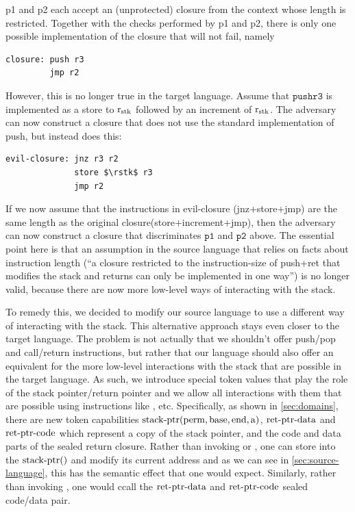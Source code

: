 \documentclass[a4paper]{article}
\begin{document}
p1 and p2 each accept an (unprotected) closure from the context whose length is restricted.
Together with the checks performed by p1 and p2, there is only one possible implementation of the closure that will not fail, namely
\begin{lstlisting}[basicstyle=\sourcecolor{}\ttfamily] 
closure: push r3
         jmp r2
\end{lstlisting}

However, this is no longer true in the target language.
Assume that $\mathtt{push r3}$ is implemented as a store to $\mathrm{r}_\mathrm{stk}$ followed by an increment of $\mathrm{r}_\mathrm{stk}$.
The adversary can now construct a closure that does not use the standard implementation of push, but instead does this:
\begin{lstlisting}[basicstyle=\targetcolor{}\ttfamily] 
evil-closure: jnz r3 r2
              store $\rstk$ r3
              jmp r2
\end{lstlisting}
If we now assume that the instructions in evil-closure (jnz+store+jmp) are the same length as the original closure(store+increment+jmp), then the adversary can now construct a closure that discriminates $\mathtt{p1}$ and $\mathtt{p2}$ above.
The essential point here is that an assumption in the source language that relies on facts about instruction length (``a closure restricted to the instruction-size of push+ret that modifies the stack and returns can only be implemented in one way'') is no longer valid, because there are now more low-level ways of interacting with the stack.

To remedy this, we decided to modify our source language to use a different way of interacting with the stack.
This alternative approach stays even closer to the target language.
The problem is not actually that we shouldn't offer push/pop and call/return instructions, but rather that our language should also offer an equivalent for the more low-level interactions with the stack that are possible in the target language.
As such, we introduce special token values that play the role of the stack pointer/return pointer and we allow all interactions with them that are possible using instructions like \sstore{}{}, \smove{}{} etc.
Specifically, as shown in \cref{sec:domains}, there are new token capabilities $\mathrm{stack\text{-}ptr}(\mathrm{perm},\mathrm{base},\mathrm{end},\mathrm{a})$, $\mathrm{ret\text{-}ptr\text{-}data}$ and $\mathrm{ret\text{-}ptr\text{-}code}$ which represent a copy of the stack pointer, and the code and data parts of the sealed return closure.
Rather than invoking \spush{} or \spop{}, one can store into the $\mathrm{stack\text{-}ptr}()$ and modify its current address and as we can see in \cref{sec:source-language}, this has the semantic effect that one would expect.
Similarly, rather than invoking \sreturn{}, one would ccall the $\mathrm{ret\text{-}ptr\text{-}data}$ and $\mathrm{ret\text{-}ptr\text{-}code}$ sealed code/data pair.
\end{document}
